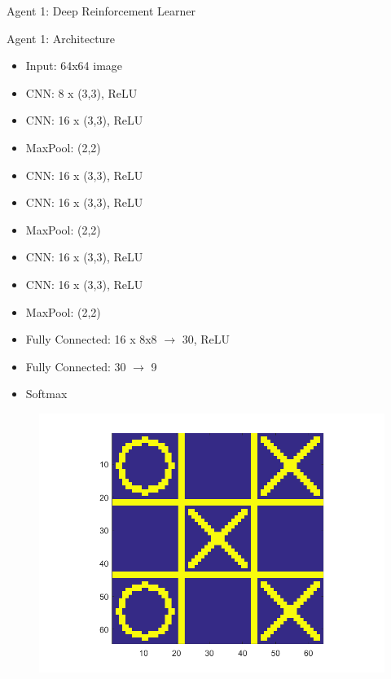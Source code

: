 \documentclass[11pt]{beamer}
\begin{document}
\begin{frame}{Agent 1: Deep Reinforcement Learner}
\begin{minipage}[t]{0.4\linewidth}
\begin{figure}[tttDL]
			\end{figure}
		\end{minipage}
	\end{frame}
	
	\begin{frame}{Agent 1: Architecture}
		\begin{minipage}[t]{0.68\linewidth}
			\begin{itemize}
				\item Input: 64x64 image
				\item CNN: 8  x (3,3), ReLU
				\item[] CNN: 16 x (3,3), ReLU
				\item[] MaxPool: (2,2)
				\item CNN: 16 x (3,3), ReLU
				\item[] CNN: 16 x (3,3), ReLU
				\item[] MaxPool: (2,2)
				\item CNN: 16 x (3,3), ReLU
				\item[] CNN: 16 x (3,3), ReLU
				\item[] MaxPool: (2,2)
				\item Fully Connected: 16 x 8x8 $\rightarrow$ 30, ReLU
				\item Fully Connected: 30 $\rightarrow$ 9
				\item Softmax
			\end{itemize}
		\end{minipage}
		\hfill
		\begin{minipage}[t]{0.3\linewidth}
			\centering
			\begin{figure}[tttDL]
				\centering
				\includegraphics[width=1.5\textwidth]{Figures/boardExample.png}
			\end{figure}
		\end{minipage}
	\end{frame}
	
\end{document}
